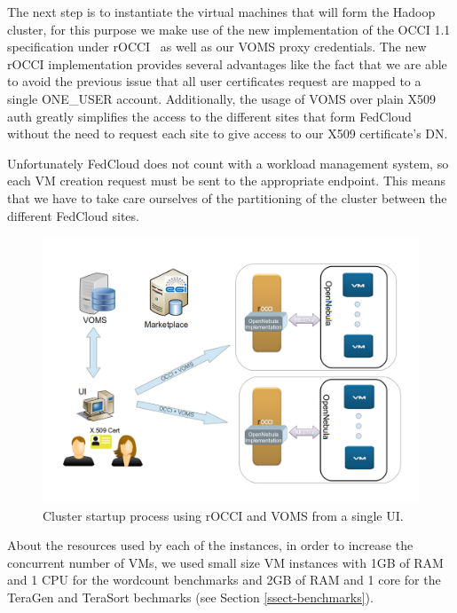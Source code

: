 The next step is to instantiate the virtual machines that will form the Hadoop cluster, for this purpose we make use of the new implementation of the OCCI 1.1 specification under rOCCI~\cite{rocci} as well as our VOMS proxy credentials. The new rOCCI implementation provides several advantages like the fact that we are able to avoid the previous issue that all user certificates request are mapped to a single ONE\_USER account.
Additionally, the usage of VOMS over plain X509 auth greatly simplifies the access to the different sites that form FedCloud without the need to request each site to give access to our X509 certificate's DN.

Unfortunately FedCloud does not count with a workload management system, so each VM creation request must be sent to the appropriate endpoint. This means that we have to take care ourselves of the partitioning of the cluster between the different FedCloud sites.


\begin{figure}[h]
\centering
\includegraphics[width=\textwidth]{figures/client-v2.png}
\caption{Cluster startup process using rOCCI and VOMS from a single UI.}
\label{fig:client}
\end{figure}

About the resources used by each of the instances, in order to increase the concurrent number of VMs, we used small size VM instances with 1GB of RAM and 1 CPU for the wordcount benchmarks and 2GB of RAM and 1 core for the TeraGen and TeraSort bechmarks (see Section \ref{ssect-benchmarks}).


